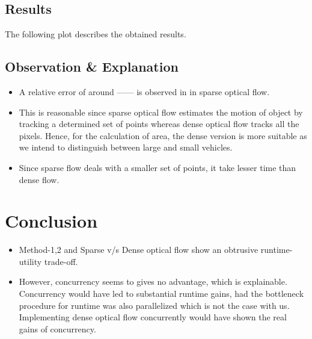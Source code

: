 \documentclass[a4paper]{article}
\begin{document}
\subsection*{Results}
The following plot describes the obtained results.
\subsection*{Observation \& Explanation}
\begin{itemize}
    \item A relative error of around ------ is observed in in sparse optical flow. 
    \item  This is reasonable since sparse optical flow estimates the motion of object by tracking a determined set of points whereas dense optical flow tracks all the pixels. Hence, for the calculation of area, the dense version is more suitable as we intend to distinguish between large and small vehicles.
    \item Since sparse flow deals with a smaller set of points, it take lesser time than dense flow.
\end{itemize}
\section*{Conclusion}
\begin{itemize}
    \item Method-1,2 and Sparse v/s Dense optical flow show an obtrusive runtime-utility trade-off.
    \item  However, concurrency seems to gives no advantage, which is explainable. Concurrency would have led to substantial runtime gains, had the bottleneck procedure for runtime was also parallelized which is not the case with us. Implementing dense optical flow concurrently would have shown the real gains of concurrency. 
\end{itemize}
\end{document}
